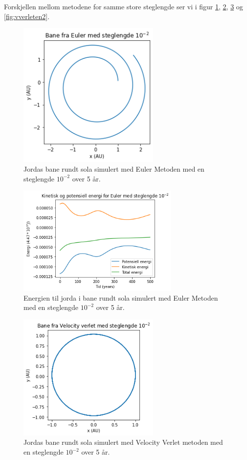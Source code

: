 \documentclass[reprint,english,notitlepage]{revtex4-1}
\begin{document}
	Forskjellen mellom metodene for samme store steglengde ser vi i figur \ref{fig:euler2}, \ref{fig:euleren2}, \ref{fig:vverlet2} og \ref{fig:vverleten2}.
	\begin{figure}[H]
		\includegraphics[width=70mm]{../../Code/Figures/euler2.png}
		\caption{Jordas bane rundt sola simulert med Euler Metoden med en steglengde $10^{-2}$ over 5 år.}
		\label{fig:euler2}
	\end{figure}

	\begin{figure}[H]
		\includegraphics[width=80mm]{../../Code/Figures/euleren2.png}
		\caption{Energien til jorda i bane rundt sola simulert med Euler Metoden med en steglengde $10^{-2}$ over 5 år.}
		\label{fig:euleren2}
	\end{figure}

	\begin{figure}[H]
		\includegraphics[width=70mm]{../../Code/Figures/vverlet2.png}
		\caption{Jordas bane rundt sola simulert med Velocity Verlet metoden med en steglengde $10^{-2}$ over 5 år.}
		\label{fig:vverlet2}
	\end{figure}
	
\end{document}
